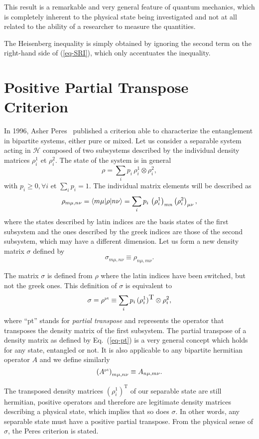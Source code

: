  This result is a remarkable and very general feature of quantum mechanics, which is completely inherent to the physical state being investigated and not at all related to the ability of a researcher to measure the quantities. 

The Heisenberg inequality is simply obtained by ignoring  the second term on the right-hand side of (\ref{eq-SRI}), which only accentuates the inequality.

\section{Positive Partial Transpose Criterion} \label{sec-PPT}

In 1996, Asher Peres~\cite{Per96} published a criterion able to characterize the entanglement in bipartite systems, either pure or mixed. Let us consider a separable system acting in $\mathcal{H}$ composed of two subsystems described by the individual density matrices $\rho^1_i$ et $\rho^2_i$. The state of the system is in general 
\[ \rho = \sum_i p_i \, \rho^1_i \otimes \rho^2_i, \label{eq-mixed} \]
with $p_i \ge 0, \forall i$ et $\sum_i p_i=1$. The individual matrix elements will be described as 
\[  \rho_{m\mu,n\nu}=\langle m \mu | \rho | n \nu \rangle = \sum_i p_i \,\left(\rho^1_i \right)_{mn} \left(\rho^2_i\right)_{\mu\nu},  \]
where the states described by latin indices are the basis states of the first subsystem and the ones described by the greek indices are those of the second subsystem, which may have a different dimension. Let us form a new density matrix $\sigma$ defined by
\[  \sigma_{m\mu,n\nu} \equiv  \rho_{n\mu,m\nu} \label{eq-pt} .\]

The matrix $\sigma$ is defined from $\rho$ where the latin indices have been switched, but not the greek ones. This definition of $\sigma$ is equivalent to
\[ \sigma=\rho^{\mbox{\tiny \textup{pt}}}  \equiv  \sum_i p_i \, (\rho^1_i)^{\mbox{T}} \otimes \rho^2_i, \]
where ``pt'' stands for \textit{partial transpose} and represents the operator that transposes the density matrix of the first subsystem. The partial transpose of a density matrix as defined by Eq.~(\ref{eq-pt}) is a very general concept which holds for any state, entangled or not. It is also applicable to any bipartite hermitian operator $A$ and we define similarly 
\[  \left(A^{\mbox{\tiny \textup{pt}}} \right)_{m\mu,n\nu} \equiv  A_{n\mu,m\nu}.\]

The transposed density matrices $(\rho^1_i)^{\mbox{T}}$ of our separable state are still hermitian, positive operators and therefore are legitimate density matrices describing a physical state, which implies that so does $\sigma$. In other words, any separable state must have a positive partial transpose. From the physical sense of $\sigma$, the Peres criterion is stated.

